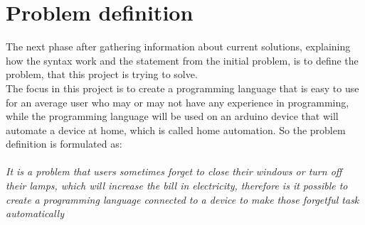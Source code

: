 \section{Problem definition}
The next phase after gathering information about current solutions, explaining how the syntax work and the statement from the initial problem, is to define the problem, that this project is trying to solve. \\ The focus in this project is to create a programming language that is easy to use for an average user who may or may not have any experience in programming, while the programming language will be used on an arduino device that will automate a device at home, which is called home automation. So the problem definition is formulated as:\\
\\
\textit{It is a problem that users sometimes forget to close their windows or turn off their lamps, which will increase the bill in electricity, therefore is it possible to create a programming language connected to a device to make those forgetful task automatically}
